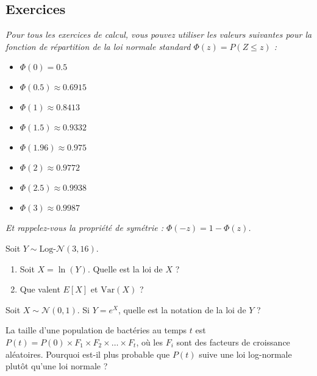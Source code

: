 \subsection{Exercices}

\textit{Pour tous les exercices de calcul, vous pouvez utiliser les valeurs suivantes pour la fonction de répartition de la loi normale standard $\Phi(z) = P(Z \le z)$ :}
\begin{itemize}
    \item $\Phi(0) = 0.5$
    \item $\Phi(0.5) \approx 0.6915$
    \item $\Phi(1) \approx 0.8413$
    \item $\Phi(1.5) \approx 0.9332$
    \item $\Phi(1.96) \approx 0.975$
    \item $\Phi(2) \approx 0.9772$
    \item $\Phi(2.5) \approx 0.9938$
    \item $\Phi(3) \approx 0.9987$
\end{itemize}
\textit{Et rappelez-vous la propriété de symétrie : $\Phi(-z) = 1 - \Phi(z)$.}


\begin{exercicebox}
Soit $Y \sim \text{Log-}\mathcal{N}(3, 16)$.
\begin{enumerate}
    \item Soit $X = \ln(Y)$. Quelle est la loi de $X$ ?
    \item Que valent $E[X]$ et $\text{Var}(X)$ ?
\end{enumerate}
\end{exercicebox}

\begin{exercicebox}
Soit $X \sim \mathcal{N}(0, 1)$. Si $Y = e^X$, quelle est la notation de la loi de $Y$ ?
\end{exercicebox}

\begin{exercicebox}
La taille d'une population de bactéries au temps $t$ est $P(t) = P(0) \times F_1 \times F_2 \times \dots \times F_t$, où les $F_i$ sont des facteurs de croissance aléatoires.
Pourquoi est-il plus probable que $P(t)$ suive une loi log-normale plutôt qu'une loi normale ?
\end{exercicebox}

